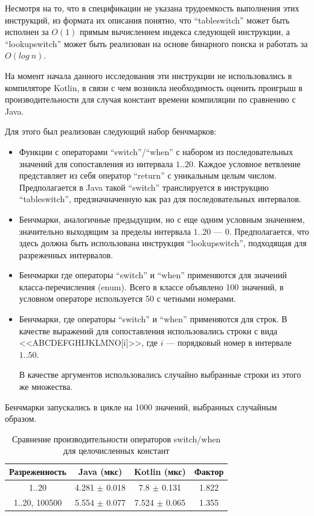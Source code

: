 Несмотря на то, что в спецификации не указана трудоемкость выполнения этих инструкций, из формата
их описания понятно, что ``tableswitch'' может быть исполнен за $O(1)$ прямым вычислением индекса
следующей инструкции, а ``lookupswitch'' может быть реализован на основе бинарного поиска и
работать за $O(log\ n)$.

На момент начала данного исследования эти инструкции не использовались в компиляторе Kotlin,
в связи с чем возникла необходимость оценить проигрыш в производительности для случая констант
времени компиляции по сравнению с Java.

Для этого был реализован следующий набор бенчмарков:
\begin{itemize}
    \item Функции с операторами ``switch''/``when'' с набором из последовательных значений
    для сопоставления из интервала $1..20$.
    Каждое условное ветвление представляет из себя оператор ``return'' с уникальным целым числом.
    Предполагается в Java такой ``switch'' транслируется в инструкцию ``tableswitch'',
    предзначначенную как раз для последовательных интервалов.

    \item Бенчмарки, аналогичные предыдущим, но с еще одним условным значением, значительно
    выходящим за пределы интервала $1..20$ --- $0$.
    Предполагается, что здесь должна быть использована инструкция ``lookupswitch'', подходящая
    для разреженных интервалов.

    \item Бенчмарки где операторы ``switch'' и ``when'' применяются для значений класса-перечисления
    (enum).
    Всего в классе объявлено 100 значений, в условном операторе используется 50 с четными номерами.

    \item Бенчмарки, где операторы ``switch'' и ``when'' применяются для строк.
    В качестве выражений для сопоставления использовались строки с вида <<ABCDEFGHIJKLMNO[i]>>,
    где $i$ --- порядковый номер в интервале $1..50$.

    В качестве аргументов использовались случайно выбранные строки из этого же множества.
\end{itemize}

Бенчмарки запускались в цикле на 1000 значений, выбранных случайным образом.

\begin{table}[h]
\begin{center}
\begin{tabular}{|c|c|c|c|} \hline
Разреженность & Java (мкс) & Kotlin (мкс) & Фактор \\ \hline
1..20 & 4.281 $\pm$ 0.018 & 7.8 $\pm$ 0.131 & 1.822\\ \hline
1..20, 100500 & 5.554 $\pm$ 0.077 & 7.524 $\pm$ 0.065 & 1.355\\ \hline
\end{tabular}
\caption{Сравнение производительности операторов switch/when для целочисленных констант}
\end{center}
\end{table}

